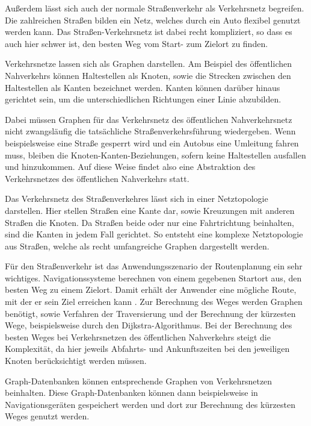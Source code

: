 Außerdem lässt sich auch der normale Straßenverkehr als Verkehrsnetz begreifen. Die zahlreichen Straßen bilden ein Netz, welches durch ein Auto flexibel genutzt werden kann. Das Straßen-Verkehrsnetz ist dabei recht kompliziert, so dass es auch hier schwer ist, den besten Weg vom Start- zum Zielort zu finden.

Verkehrsnetze lassen sich als Graphen darstellen. Am Beispiel des öffentlichen Nahverkehrs können Haltestellen als Knoten, sowie die Strecken zwischen den Haltestellen als Kanten bezeichnet werden. Kanten können darüber hinaus gerichtet sein, um die unterschiedlichen Richtungen einer Linie abzubilden. \cite[p.~74 ff.]{bartelme01}

Dabei müssen Graphen für das Verkehrsnetz des öffentlichen Nahverkehrsnetz nicht zwangsläufig die tatsächliche Straßenverkehrsführung wiedergeben. Wenn beispielsweise eine Straße gesperrt wird und ein Autobus eine Umleitung fahren muss, bleiben die Knoten-Kanten-Beziehungen, sofern keine Haltestellen ausfallen und hinzukommen. Auf diese Weise findet also eine Abstraktion des Verkehrsnetzes des öffentlichen Nahverkehrs statt.  \cite[p.~74 ff.]{bartelme01}

Das Verkehrsnetz des Straßenverkehres lässt sich in einer Netztopologie darstellen. Hier stellen Straßen eine Kante dar, sowie Kreuzungen mit anderen Straßen die Knoten. Da Straßen beide oder nur eine Fahrtrichtung beinhalten, sind die Kanten in jedem Fall gerichtet. So entsteht eine komplexe Netztopologie aus Straßen, welche als recht umfangreiche Graphen dargestellt werden. \cite[p.~122]{bartelme01}

Für den Straßenverkehr ist das Anwendungsszenario der Routenplanung ein sehr wichtiges. Navigationssysteme berechnen von einem gegebenen Startort aus, den besten Weg zu einem Zielort. Damit erhält der Anwender eine mögliche Route, mit der er sein Ziel erreichen kann \cite[p.~122]{bartelme01}. Zur Berechnung des Weges werden Graphen benötigt, sowie Verfahren der Traversierung und der Berechnung der kürzesten Wege, beispielsweise durch den Dijkstra-Algorithmus. Bei der Berechnung des besten Weges bei Verkehrsnetzen des öffentlichen Nahverkehrs steigt die Komplexität, da hier jeweils Abfahrts- und Ankunftszeiten bei den jeweiligen Knoten berücksichtigt werden müssen.

Graph-Datenbanken können entsprechende Graphen von Verkehrsnetzen beinhalten. Diese Graph-Datenbanken können dann beispielsweise in Navigationsgeräten gespeichert werden und dort zur Berechnung des kürzesten Weges genutzt werden.


